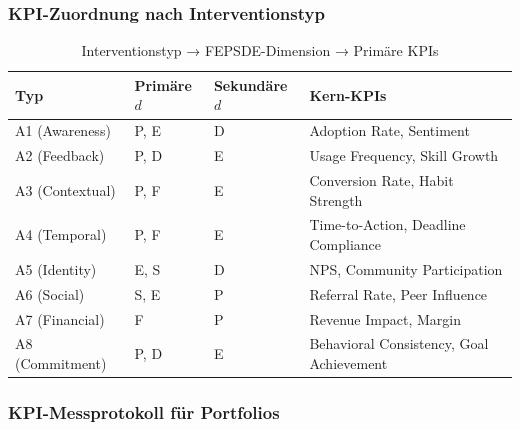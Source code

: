 \subsubsection{KPI-Zuordnung nach Interventionstyp}

\begin{table}[htbp]
\centering
\caption{Interventionstyp → FEPSDE-Dimension → Primäre KPIs}
\label{tab:20-type-kpi-mapping}
\renewcommand{\arraystretch}{1.3}
\footnotesize
\begin{tabular}{@{}llll@{}}
\toprule
\textbf{Typ} & \textbf{Primäre $d$} & \textbf{Sekundäre $d$} & \textbf{Kern-KPIs} \\
\midrule
A1 (Awareness) & P, E & D & Adoption Rate, Sentiment \\
A2 (Feedback) & P, D & E & Usage Frequency, Skill Growth \\
A3 (Contextual) & P, F & E & Conversion Rate, Habit Strength \\
A4 (Temporal) & P, F & E & Time-to-Action, Deadline Compliance \\
A5 (Identity) & E, S & D & NPS, Community Participation \\
A6 (Social) & S, E & P & Referral Rate, Peer Influence \\
A7 (Financial) & F & P & Revenue Impact, Margin \\
A8 (Commitment) & P, D & E & Behavioral Consistency, Goal Achievement \\
\bottomrule
\end{tabular}
\end{table}

\subsubsection{KPI-Messprotokoll für Portfolios}

